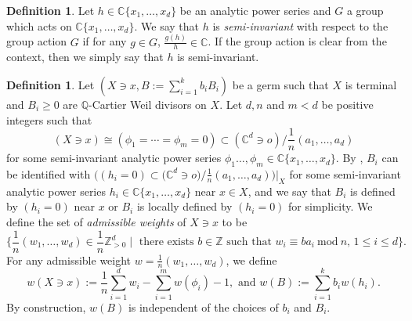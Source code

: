 \documentclass[11pt]{amsart}
\numberwithin{equation}{section}
\newcommand{\Cc}{\mathbb{C}}
\newcommand{\Qq}{\mathbb{Q}}
\theoremstyle{definition}
\theoremstyle{definition}
\newtheorem{defn}[thm]{Definition}
\begin{document}
\begin{defn}
Let $h\in \mathbb{C}\{x_1,\dots,x_d\}$ be an analytic power series and $G$ a group which acts on $\Cc\{x_1,\dots,x_d\}$. We say that $h$ is \emph{semi-invariant} with respect to the group action $G$ if for any $g\in G$, $\frac{g(h)}{h}\in \mathbb{C}$. If the group action is clear from the context, then we simply say that $h$ is semi-invariant.
\end{defn}

\begin{defn}\label{def: Weights of threefolds terminal singularities}
Let $(X\ni x,B:=\sum_{i=1}^k b_iB_i)$ be a germ such that $X$ is terminal and $B_i\geq 0$ are $\Qq$-Cartier Weil divisors on $X$. Let $d,n$ and $m<d$ be positive integers such that
$$(X\ni x)\cong (\phi_1=\cdots =\phi_m=0)\subset (\mathbb C^d\ni o)/\frac{1}{n}(a_1,\dots,a_d)$$ for some semi-invariant analytic power series $\phi_1\dots,\phi_m\in \mathbb{C}\{x_1,\dots,x_d\}$. By \cite[Lemma~5.1]{Kaw88}, $B_i$ can be identified with $\big((h_i=0)\subset \mathbb (\mathbb{C}^d\ni o)/\frac{1}{n}(a_1,\dots,a_d)\big)|_X$ for some semi-invariant analytic power series $h_i\in \mathbb{C}\{x_1,\dots,x_d\}$ near $x\in X$, and we say that $B_i$ is defined by $(h_i=0)$ near $x$ or $B_i$ is locally defined by $(h_i=0)$ for simplicity. We define the set of \emph{admissible weights} of $X\ni x$ to be $$\{\frac{1}{n}(w_1,\dots,w_d)\in\frac{1}{n}\mathbb Z^d_{>0}\mid \text{ there exists $b\in\mathbb{Z}$ such that $w_i\equiv b a_i~\mathrm{mod}~n$, $1\leq i\leq d$}\}.$$ For any admissible weight $w=\frac{1}{n}(w_1,\dots,w_d)$, 
we define 
$$w(X\ni x):=\frac{1}{n}\sum_{i=1}^d w_i-\sum_{i=1}^m w(\phi_i)-1, \text{ and } w(B):=\sum_{i=1}^k b_iw(h_i).$$
By construction, $w(B)$ is independent of the choices of $b_i$ and $B_i$.
\end{defn}
\end{document}
